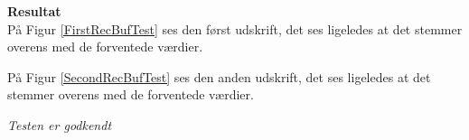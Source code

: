 \textbf{Resultat} \\


På Figur \ref{FirstRecBufTest} ses den først udskrift, det ses ligeledes at det stemmer overens med de forventede værdier.


På Figur \ref{SecondRecBufTest} ses den anden udskrift, det ses ligeledes at det stemmer overens med de forventede værdier.  



\textit{Testen er godkendt}




